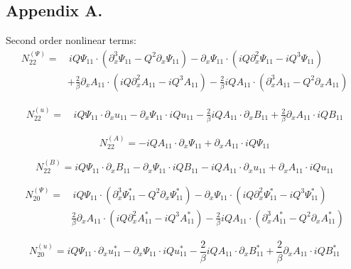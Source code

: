 \documentclass{emulateapj}
\newcommand{\beq}{\begin{equation}}
\newcommand{\eeq}{\end{equation}}
\begin{document}
\newpage
\begin{appendices}
\begin{widetext}
\section*{Appendix A.}

Second order nonlinear terms: \\

\beq
\begin{split}
N_{22}^{(\Psi)} = & \, i Q \Psi_{11} \cdot \left(\partial_x^3 \Psi_{11} - Q^2 \partial_x \Psi_{11}\right) - \partial_x \Psi_{11} \cdot \left(i Q \partial_x^2 \Psi_{11} - i Q^3 \Psi_{11}\right) \\
& + \frac{2}{\beta}\partial_x A_{11} \cdot \left(i Q \partial_x^2 A_{11} - i Q^3 A_{11}\right) - \frac{2}{\beta} i Q A_{11} \cdot \left(\partial_x^3 A_{11} - Q^2 \partial_x A_{11}\right)
\end{split}
\eeq

\beq
\begin{split}
N_{22}^{(u)} = & \, i Q \Psi_{11} \cdot \partial_x u_{11} - \partial_x \Psi_{11} \cdot i Q u_{11} - \frac{2}{\beta} i Q A_{11} \cdot \partial_x B_{11} + \frac{2}{\beta} \partial_x A_{11} \cdot i Q B_{11}
\end{split}
\eeq

\beq
N_{22}^{(A)} = - i Q A_{11} \cdot \partial_x \Psi_{11} + \partial_x A_{11} \cdot i Q \Psi_{11}
\eeq

\beq
N_{22}^{(B)} = i Q \Psi_{11} \cdot \partial_x B_{11} - \partial_x \Psi_{11} \cdot i Q B_{11} - i Q A_{11} \cdot \partial_x u_{11} + \partial_x A_{11} \cdot i Q u_{11}
\eeq

\beq
\begin{split}
N_{20}^{(\Psi)} = & \, i Q \Psi_{11} \cdot \left(\partial_x^3 \Psi_{11}^* - Q^2 \partial_x \Psi_{11}^*\right) - \partial_x \Psi_{11} \cdot \left(i Q \partial_x^2 \Psi_{11}^* - i Q^3 \Psi_{11}^*\right) \\
& \frac{2}{\beta} \partial_x A_{11} \cdot \left(i Q \partial_x^2 A_{11}^* - i Q^3 A_{11}^*\right) - \frac{2}{\beta} i Q A_{11} \cdot \left(\partial_x^3 A_{11}^* - Q^2 \partial_x A_{11}^*\right)
\end{split}
\eeq

\beq
N_{20}^{(u)} = i Q \Psi_{11} \cdot \partial_x u_{11}^* - \partial_x \Psi_{11} \cdot i Q u_{11}^* - \frac{2}{\beta} i Q A_{11} \cdot \partial_x B_{11}^* + \frac{2}{\beta} \partial_x A_{11} \cdot i Q B_{11}^*
\eeq


\end{widetext}
\end{appendices}
\end{document}
